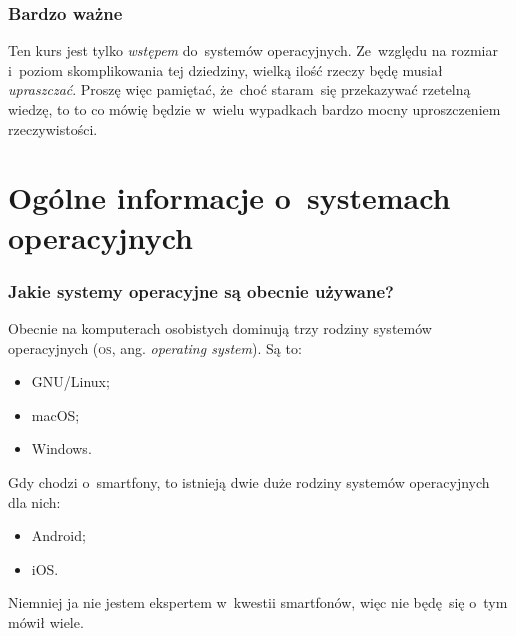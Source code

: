 \documentclass[10pt,t]{beamer}
\begin{document}
\begin{frame}
  \frametitle{Bardzo ważne}


  Ten kurs jest tylko \textit{wstępem} do~systemów operacyjnych. Ze~względu
  na rozmiar i~poziom skomplikowania tej dziedziny, wielką ilość rzeczy
  będę musiał \textit{upraszczać}. Proszę więc pamiętać, że~choć staram~się
  przekazywać rzetelną wiedzę, to to co mówię będzie w~wielu wypadkach
  bardzo mocny uproszczeniem rzeczywistości.

\end{frame}










\section{Ogólne informacje o~systemach operacyjnych}


\begin{frame}
  \frametitle{Jakie systemy operacyjne są obecnie używane?}


  Obecnie na komputerach osobistych dominują trzy rodziny systemów
  operacyjnych (\textsc{os}, ang. \textit{operating system}). Są to:
  \begin{itemize}

  \item GNU/Linux;

  \item macOS;

  \item Windows.

  \end{itemize}

  Gdy chodzi o~smartfony, to istnieją dwie duże rodziny systemów
  operacyjnych dla nich:
  \begin{itemize}

  \item Android;

  \item iOS.

  \end{itemize}
  Niemniej ja nie jestem ekspertem w~kwestii smartfonów, więc nie będę~się
  o~tym mówił wiele.

\end{frame}
\end{document}
